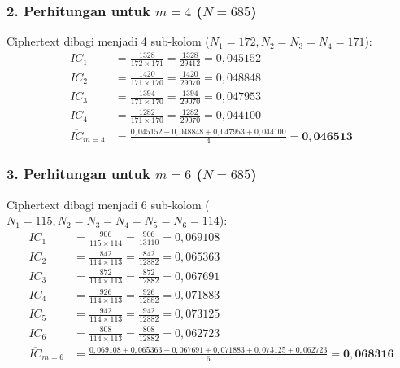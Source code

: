 \documentclass[11pt,a4paper]{article}
\begin{document}
\subsubsection*{2. Perhitungan untuk $m = 4$ ($N = 685$)}
Ciphertext dibagi menjadi 4 sub-kolom ($N_1 = 172, N_2 = N_3 = N_4 = 171$):
\begin{align*}
IC_1 &= \frac{1328}{172 \times 171} = \frac{1328}{29412} = 0{,}045152 \\
IC_2 &= \frac{1420}{171 \times 170} = \frac{1420}{29070} = 0{,}048848 \\
IC_3 &= \frac{1394}{171 \times 170} = \frac{1394}{29070} = 0{,}047953 \\
IC_4 &= \frac{1282}{171 \times 170} = \frac{1282}{29070} = 0{,}044100 \\[0.2cm]
\overline{IC}_{m=4} &= \frac{0{,}045152 + 0{,}048848 + 0{,}047953 + 0{,}044100}{4} = \mathbf{0{,}046513}
\end{align*}

\subsubsection*{3. Perhitungan untuk $m = 6$ ($N = 685$)}
Ciphertext dibagi menjadi 6 sub-kolom ($N_1 = 115, N_2 = N_3 = N_4 = N_5 = N_6 = 114$):
\begin{align*}
IC_1 &= \frac{906}{115 \times 114} = \frac{906}{13110} = 0{,}069108 \\
IC_2 &= \frac{842}{114 \times 113} = \frac{842}{12882} = 0{,}065363 \\
IC_3 &= \frac{872}{114 \times 113} = \frac{872}{12882} = 0{,}067691 \\
IC_4 &= \frac{926}{114 \times 113} = \frac{926}{12882} = 0{,}071883 \\
IC_5 &= \frac{942}{114 \times 113} = \frac{942}{12882} = 0{,}073125 \\
IC_6 &= \frac{808}{114 \times 113} = \frac{808}{12882} = 0{,}062723 \\[0.2cm]
\overline{IC}_{m=6} &= \frac{0{,}069108 + 0{,}065363 + 0{,}067691 + 0{,}071883 + 0{,}073125 + 0{,}062723}{6} = \mathbf{0{,}068316}
\end{align*}
\end{document}
